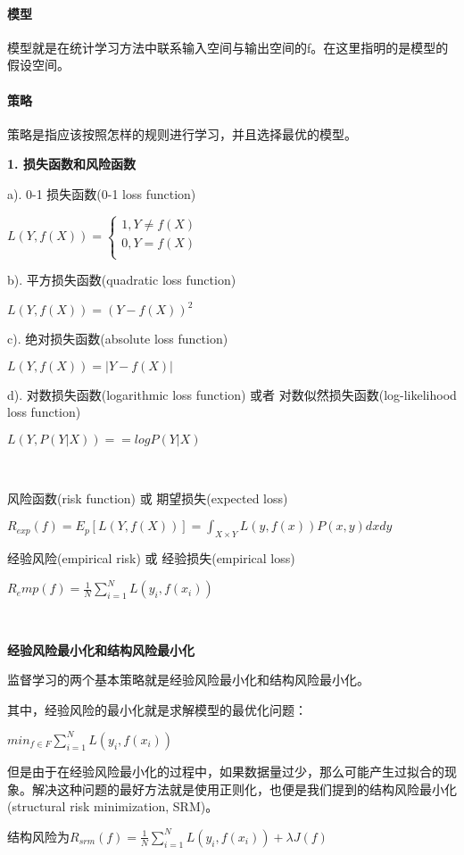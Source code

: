 \documentclass[UTF8]{ctexart}
\begin{document}
	\paragraph{模型}
	模型就是在统计学习方法中联系输入空间与输出空间的f。在这里指明的是模型的假设空间。

	\paragraph{策略}
	策略是指应该按照怎样的规则进行学习，并且选择最优的模型。

	\textbf{1. 损失函数和风险函数}	

	a). 0-1 损失函数(0-1 loss function)

	$L(Y,f(X))=\begin{cases}1,  Y\neq f(X)\\0,  Y=f(X)\\ \end{cases}$

	b). 平方损失函数(quadratic loss function)

	$L(Y,f(X))=(Y-f(X))^2$

	c). 绝对损失函数(absolute loss function)

	$L(Y,f(X))=|Y-f(X)|$

	d). 对数损失函数(logarithmic loss function) 或者 对数似然损失函数(log-likelihood loss function)

	$L(Y,P(Y|X))==logP(Y|X)$

	~

	风险函数(risk function) 或 期望损失(expected loss)

	$R_{exp}(f)=E_p[L(Y,f(X))]=\int_{X\times Y}L(y,f(x))P(x,y)dxdy$

	经验风险(empirical risk) 或 经验损失(empirical loss)

	$R_emp(f)=\frac{1}{N}\sum^N_{i=1}L(y_i,f(x_i))$

	~

	\textbf{经验风险最小化和结构风险最小化}

	监督学习的两个基本策略就是经验风险最小化和结构风险最小化。

	其中，经验风险的最小化就是求解模型的最优化问题：

	$min_{f\in F}\sum^N_{i=1}L(y_i,f(x_i))$

	但是由于在经验风险最小化的过程中，如果数据量过少，那么可能产生过拟合的现象。解决这种问题的最好方法就是使用正则化，也便是我们提到的结构风险最小化(structural risk minimization, SRM)。

	结构风险为$R_{srm}(f)=\frac{1}{N}\sum^N_{i=1}L(y_i,f(x_i))+\lambda J(f)$
\end{document}
